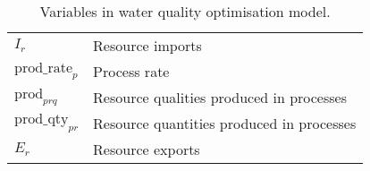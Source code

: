 	\begin{table}[h]
		\centering
		\caption{Variables in water quality optimisation model.} \label{tab:water_vars}
			\begin{tabular}{lp{7cm}}
			\toprule
			$I_r$ & Resource imports \\
			$\mbox{prod\_rate}_p$ & Process rate \\
			$\mbox{prod}_{prq}$ & Resource qualities produced in processes \\
			$\mbox{prod\_qty}_{pr}$ & Resource quantities produced in processes \\
			$E_r$ & Resource exports \\
			\bottomrule
		\end{tabular}
	\end{table}
